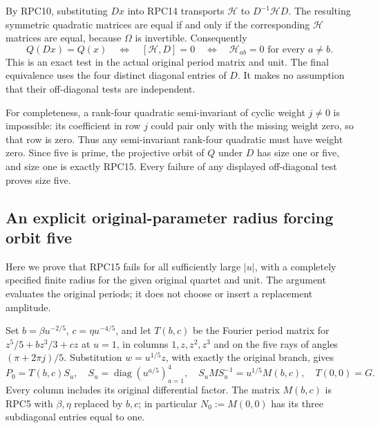 \documentclass[11pt,a4paper]{article}
\begin{document}
By RPC10, substituting $Dx$ into RPC14 transports $\mathcal H$ to
$D^{-1}\mathcal H D$. The resulting symmetric quadratic matrices
are equal if and only if the corresponding $\mathcal H$ matrices
are equal, because $\Omega$ is invertible. Consequently
\[
 \boxed{\quad Q(Dx)=Q(x)\quad\Longleftrightarrow\quad
 [\mathcal H,D]=0\quad\Longleftrightarrow\quad
 \mathcal H_{ab}=0\text{ for every }a\ne b.\quad}
 \tag{RPC15}
\]
This is an exact test in the actual original period matrix and unit.
The final equivalence uses the four distinct diagonal entries of $D$.
It makes no assumption that their off-diagonal tests are independent.

For completeness, a rank-four quadratic semi-invariant of cyclic
weight $j\ne0$ is impossible: its coefficient in row $j$ could pair
only with the missing weight zero, so that row is zero. Thus any
semi-invariant rank-four quadratic must have weight zero. Since five
is prime, the projective orbit of $Q$ under $D$ has size one or five,
and size one is exactly RPC15. Every failure of any displayed
off-diagonal test proves size five.

\subsection{An explicit original-parameter radius forcing orbit five}

Here we prove that RPC15 fails for all sufficiently large $|u|$,
with a completely specified finite radius for the given original
quartet and unit. The argument evaluates the original periods; it
does not choose or insert a replacement amplitude.

Set $b=\beta u^{-2/5}$, $c=\eta u^{-4/5}$, and let $T(b,c)$
be the Fourier period matrix for
$z^5/5+bz^3/3+cz$ at $u=1$, in columns $1,z,z^2,z^3$ and on
the five rays of angles $(\pi+2\pi j)/5$. Substitution
$w=u^{1/5}z$, with exactly the original branch, gives
\[
 P_0=T(b,c)S_u,\quad S_u=\operatorname{diag}(u^{a/5})_{a=1}^4,
 \quad S_uMS_u^{-1}=u^{1/5}M(b,c),\quad T(0,0)=G.
 \tag{RPC16}
\]
Every column includes its original differential factor. The matrix
$M(b,c)$ is RPC5 with $\beta,\eta$ replaced by $b,c$; in particular
$N_0:=M(0,0)$ has its three subdiagonal entries equal to one.
\end{document}
